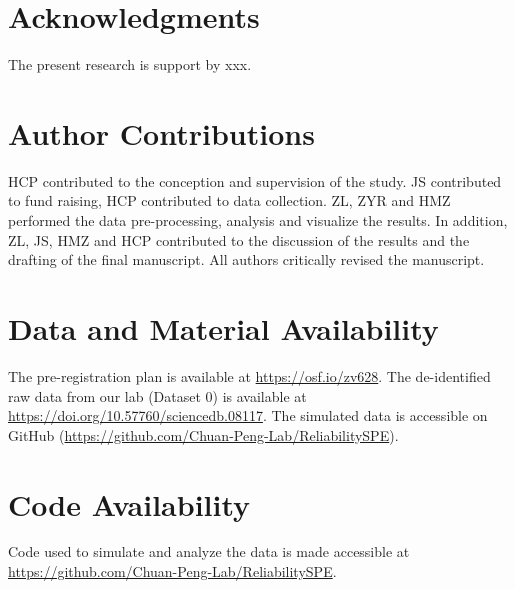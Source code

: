 \documentclass[sn-apa]{sn-jnl}%
\theoremstyle{thmstyleone}%
\theoremstyle{thmstyletwo}%
\theoremstyle{thmstylethree}%
\begin{document}




\section*{Acknowledgments}

The present research is support by xxx. 

\section*{Author Contributions}

HCP contributed to the conception and supervision of the study. JS contributed to fund raising, HCP contributed to data collection. ZL, ZYR and HMZ performed the data pre-processing, analysis and visualize the results. In addition, ZL, JS, HMZ and HCP contributed to the discussion of the results and the drafting of the final manuscript. All authors critically revised the manuscript.

\section*{Data and Material Availability}

The pre-registration plan is available at \url{https://osf.io/zv628}. The de-identified raw data from our lab (Dataset 0) is available at \url{https://doi.org/10.57760/sciencedb.08117}. The simulated data is accessible on GitHub (\url{https://github.com/Chuan-Peng-Lab/ReliabilitySPE}). 

\section*{Code Availability}

Code used to simulate and analyze the data is made accessible at \url{https://github.com/Chuan-Peng-Lab/ReliabilitySPE}. 
\end{document}

